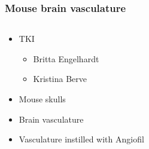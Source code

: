 \documentclass[aspectratio=169]{beamer}
\newcommand{\uaf}{\textmu Angiofil\xspace}%
\begin{document}
\begin{frame}
	\frametitle{Mouse brain vasculature}
	\begin{columns}
		\begin{column}{0.495\linewidth}
			\begin{itemize}
				\item TKI
				\begin{itemize}%
					\item Britta Engelhardt
					\item Kristina Berve
				\end{itemize}
				\item Mouse skulls
				\item Brain vasculature
				\item Vasculature instilled with \uaf~\cite{Hlushchuk2018} 
			\end{itemize}
		\end{column}
		\begin{column}{0.495\linewidth}
%
		\end{column}
	\end{columns}
\end{frame}
\end{document}

